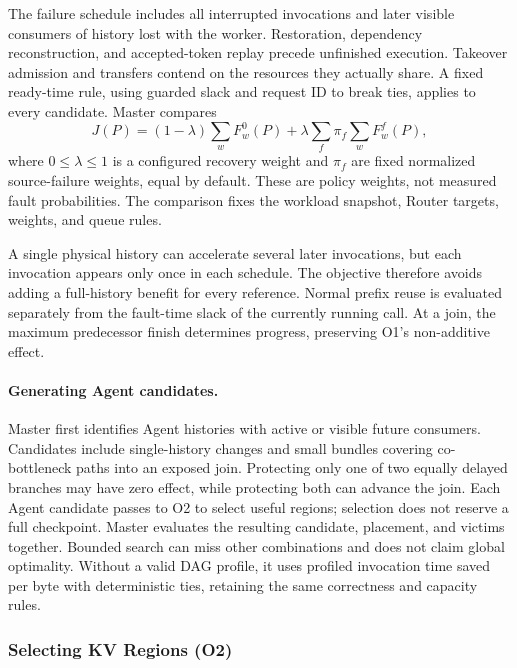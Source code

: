 The failure schedule includes all interrupted invocations and later
visible consumers of history lost with the worker. Restoration,
dependency reconstruction, and accepted-token replay precede unfinished
execution. Takeover admission and transfers contend on the resources
they actually share. A fixed ready-time rule, using guarded slack and
request ID to break ties, applies to every candidate. Master compares
\begin{equation}
 J(P)=(1-\lambda)\sum_w F_w^0(P)
       +\lambda\sum_f\pi_f\sum_w F_w^f(P),
 \label{eq:teacher-objective}
\end{equation}
where $0\le\lambda\le1$ is a configured recovery weight and $\pi_f$ are
fixed normalized source-failure weights, equal by default. These are
policy weights, not measured fault probabilities. The comparison fixes
the workload snapshot, Router targets, weights, and queue rules.

A single physical history can accelerate several later invocations,
but each invocation appears only once in each schedule. The objective
therefore avoids adding a full-history benefit for every reference.
Normal prefix reuse is evaluated separately from the fault-time slack
of the currently running call. At a join, the maximum predecessor
finish determines progress, preserving O1's non-additive effect.

\paragraph{Generating Agent candidates.}
Master first identifies Agent histories with active or visible future
consumers. Candidates include single-history changes and small bundles
covering co-bottleneck paths into an exposed join. Protecting only one
of two equally delayed branches may have zero effect, while protecting
both can advance the join. Each Agent candidate passes to O2 to
select useful regions; selection does not reserve a full checkpoint.
Master evaluates the resulting candidate, placement, and victims
together. Bounded search can miss other combinations and does not claim
global optimality. Without a valid DAG profile, it uses profiled
invocation time saved per byte with deterministic ties, retaining the
same correctness and capacity rules.

\subsubsection{Selecting KV Regions (O2)}
\label{sec:teacher-region-selection}

